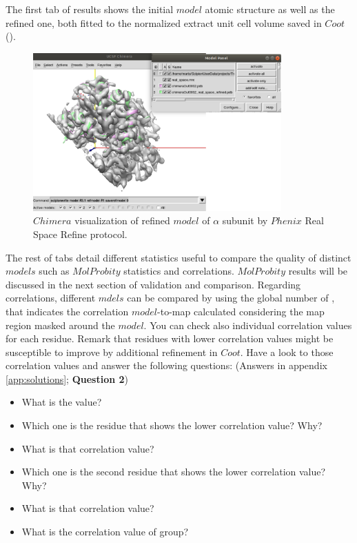 \begin{itemize}
 The first tab of results shows the initial $model$ atomic structure as well as the refined one, both fitted to the normalized extract unit cell volume saved in $Coot$ (). 
 
 \begin{figure}[H]
  \centering 
  \captionsetup{width=.7\linewidth} 
  \includegraphics[width=0.85\textwidth]{Images/Fig30.png}
  \caption{$Chimera$ visualization of refined $model$ of  $\alpha$ subunit by $Phenix$ Real Space Refine protocol.}
  \label{fig:phenix_real_space_refine_chimera}
  \end{figure}
  
  The rest of tabs detail different statistics useful to compare the quality of distinct $models$ such as $MolProbity$ statistics and  correlations. $MolProbity$ results will be discussed in the next section of validation and comparison. Regarding  correlations, different $mdels$ can be compared by using the global number of \ccmask, that indicates the correlation $model$-to-map calculated considering the map region masked around the $model$. You can check also individual correlation values for each residue.  Remark that residues with lower correlation values might be susceptible to improve by additional refinement in $Coot$. Have a look to those correlation values and answer the following questions: (Answers in appendix \ref{app:solutions}; \textbf{Question 2}) \\
  
  \begin{minipage}{\linewidth}
  \begin{framed}
  \begin{itemize}
  \item What is the \ccmask value?
  \item Which one is the residue that shows the lower correlation value? Why?
  \item What is that correlation value?
  \item Which one is the second residue that shows the lower correlation value? Why?
  \item What is that correlation value?
  \item What is the correlation value of  group?
  \end{itemize}
  \end{framed}
  \end{minipage}
  

\end{itemize}
